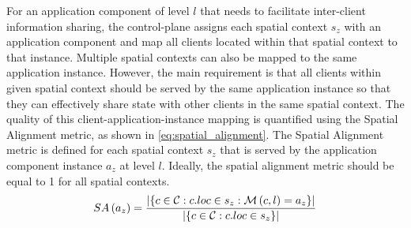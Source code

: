 For an application component of level $l$ that needs to facilitate inter-client information sharing, the control-plane assigns each spatial context $s_z$ with an application component and map all clients located within that spatial context to that instance. Multiple spatial contexts can also be mapped to the same application instance. However, the main requirement is that all clients within given spatial context should be served by the same application instance so that they can effectively share state with other clients in the same spatial context. The quality of this client-application-instance mapping is quantified using the Spatial Alignment metric, as shown in \cref{eq:spatial_alignment}. The Spatial Alignment metric is defined for each spatial context $s_z$ that is served by the application component instance $a_z$ at level $l$.  Ideally, the spatial alignment metric should be equal to 1 for all spatial contexts.
\begin{equation}
\label{eq:spatial_alignment}
SA \left( a_z \right) = \dfrac{|\{ c \in \mathcal{C} : c.loc \in s_z  : \mathcal{M} \left( c, l\right) = a_z \}|}{|\{ c \in \mathcal{C} : c.loc \in s_z \}|}
\end{equation}

